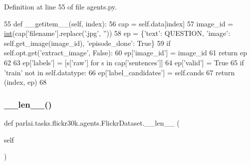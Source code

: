 Definition at line 55 of file agents.\+py.


\begin{DoxyCode}
55     \textcolor{keyword}{def }\_\_getitem\_\_(self, index):
56         cap = self.data[index]
57         image\_id = \hyperlink{namespacelanguage__model_1_1eval__ppl_a7d12ee00479673c5c8d1f6d01faa272a}{int}(cap[\textcolor{stringliteral}{'filename'}].replace(\textcolor{stringliteral}{'.jpg'}, \textcolor{stringliteral}{''}))
58         ep = \{\textcolor{stringliteral}{'text'}: QUESTION, \textcolor{stringliteral}{'image'}: self.get\_image(image\_id), \textcolor{stringliteral}{'episode\_done'}: \textcolor{keyword}{True}\}
59         \textcolor{keywordflow}{if} self.opt.get(\textcolor{stringliteral}{'extract\_image'}, \textcolor{keyword}{False}):
60             ep[\textcolor{stringliteral}{'image\_id'}] = image\_id
61             \textcolor{keywordflow}{return} ep
62 
63         ep[\textcolor{stringliteral}{'labels'}] = [s[\textcolor{stringliteral}{'raw'}] \textcolor{keywordflow}{for} s \textcolor{keywordflow}{in} cap[\textcolor{stringliteral}{'sentences'}]]
64         ep[\textcolor{stringliteral}{'valid'}] = \textcolor{keyword}{True}
65         \textcolor{keywordflow}{if} \textcolor{stringliteral}{'train'} \textcolor{keywordflow}{not} \textcolor{keywordflow}{in} self.datatype:
66             ep[\textcolor{stringliteral}{'label\_candidates'}] = self.cands
67         \textcolor{keywordflow}{return} (index, ep)
68 
\end{DoxyCode}
\mbox{\label{classparlai_1_1tasks_1_1flickr30k_1_1agents_1_1FlickrDataset_a2ff37f962e9df151e2bce0140dc65aa1}} 
\subsubsection{\texorpdfstring{\+\_\+\+\_\+len\+\_\+\+\_\+()}{\_\_len\_\_()}}
{\footnotesize\ttfamily def parlai.\+tasks.\+flickr30k.\+agents.\+Flickr\+Dataset.\+\_\+\+\_\+len\+\_\+\+\_\+ (\begin{DoxyParamCaption}\item[{}]{self }\end{DoxyParamCaption})}




